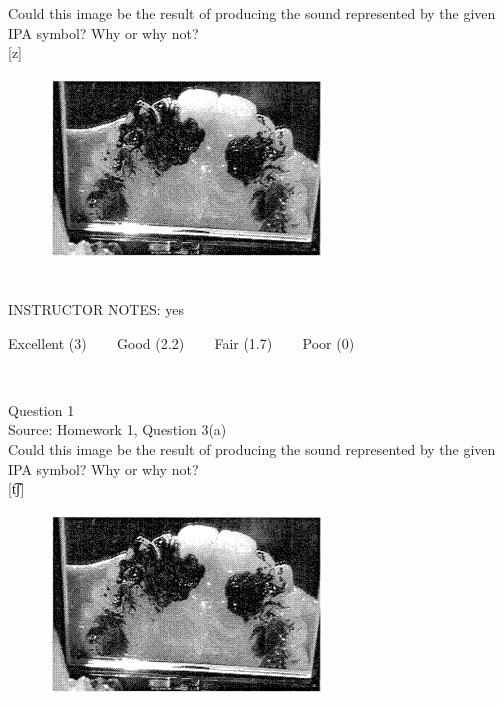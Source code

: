 \documentclass[12pt]{article}
\begin{document}
Could this image be the result of producing the sound represented by the given IPA symbol? Why or why not?\\

{[z]}

\begin{figure}[H]
\includegraphics{../images/staticpalatography_fricative.png}
\end{figure}

~\\
INSTRUCTOR NOTES: yes


\vfill
Excellent (3) ~~~ Good (2.2) ~~~ Fair (1.7) ~~~ Poor (0)
\newpage

\begin{center}
\textbf{{\color{red}{\HUGE END OF EXAM}}}\\

\end{center}
\newpage

\begin{center}
\textbf{{\color{blue}{\HUGE START OF EXAM\\}}}

\textbf{{\color{blue}{\HUGE Student ID: 55084\\}}}

\textbf{{\color{blue}{\HUGE 4:20\\}}}

\end{center}
\newpage

{\large Question 1}\\

Source: Homework 1, Question 3(a)\\

Could this image be the result of producing the sound represented by the given IPA symbol? Why or why not?\\

{[t͡ʃ]}

\begin{figure}[H]
\includegraphics{../images/staticpalatography_fricative.png}
\end{figure}
\end{document}
